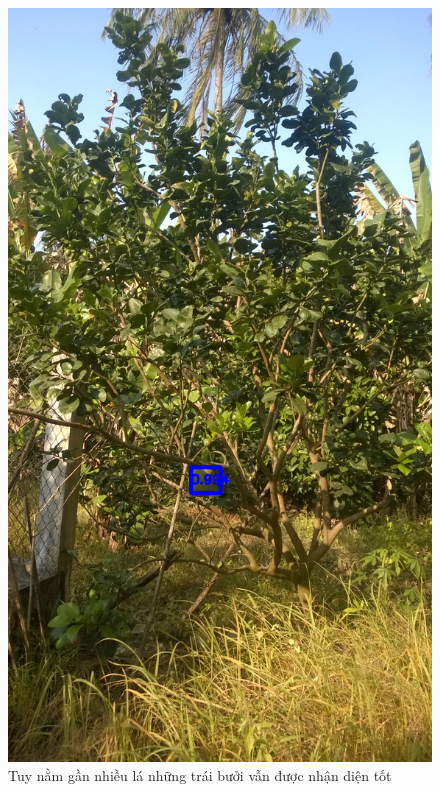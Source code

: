 \begin{center}
    \begin{figure}[H]
    \centering
    \includegraphics[width=0.7\columnwidth]{images/chap3/demo_008.jpg}
    \caption{Tuy nằm gần nhiều lá những trái bưởi vẫn được nhận diện tốt}
    \label{chap3:lack1}
    \end{figure}
\end{center}
